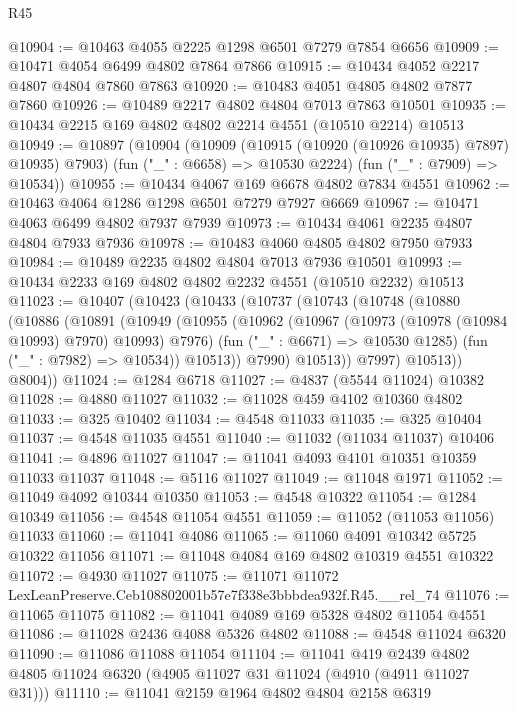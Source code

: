 \begin{lexlean}{R45}
\begin{coremodule}
@10904 := @10463 @4055 @2225 @1298 @6501 @7279 @7854 @6656
@10909 := @10471 @4054 @6499 @4802 @7864 @7866
@10915 := @10434 @4052 @2217 @4807 @4804 @7860 @7863
@10920 := @10483 @4051 @4805 @4802 @7877 @7860
@10926 := @10489 @2217 @4802 @4804 @7013 @7863 @10501
@10935 := @10434 @2215 @169 @4802 @4802 @2214 @4551 (@10510 @2214) @10513
@10949 := @10897
    (@10904
      (@10909 (@10915 (@10920 (@10926 @10935) @7897) @10935) @7903)
      (fun ("_" : @6658) => @10530 @2224)
      (fun ("_" : @7909) => @10534))
@10955 := @10434 @4067 @169 @6678 @4802 @7834 @4551
@10962 := @10463 @4064 @1286 @1298 @6501 @7279 @7927 @6669
@10967 := @10471 @4063 @6499 @4802 @7937 @7939
@10973 := @10434 @4061 @2235 @4807 @4804 @7933 @7936
@10978 := @10483 @4060 @4805 @4802 @7950 @7933
@10984 := @10489 @2235 @4802 @4804 @7013 @7936 @10501
@10993 := @10434 @2233 @169 @4802 @4802 @2232 @4551 (@10510 @2232) @10513
@11023 := @10407
    (@10423
      (@10433
        (@10737
          (@10743
            (@10748
              (@10880
                (@10886
                  (@10891
                    (@10949
                      (@10955
                        (@10962
                          (@10967 (@10973 (@10978 (@10984 @10993) @7970) @10993) @7976)
                          (fun ("_" : @6671) => @10530 @1285)
                          (fun ("_" : @7982) => @10534))
                        @10513))
                    @7990)
                  @10513))
              @7997)
            @10513))
        @8004))
@11024 := @1284 @6718
@11027 := @4837 (@5544 @11024) @10382
@11028 := @4880 @11027
@11032 := @11028 @459 @4102 @10360 @4802
@11033 := @325 @10402
@11034 := @4548 @11033
@11035 := @325 @10404
@11037 := @4548 @11035 @4551
@11040 := @11032 (@11034 @11037) @10406
@11041 := @4896 @11027
@11047 := @11041 @4093 @4101 @10351 @10359 @11033 @11037
@11048 := @5116 @11027
@11049 := @11048 @1971
@11052 := @11049 @4092 @10344 @10350
@11053 := @4548 @10322
@11054 := @1284 @10349
@11056 := @4548 @11054 @4551
@11059 := @11052 (@11053 @11056) @11033
@11060 := @11041 @4086
@11065 := @11060 @4091 @10342 @5725 @10322 @11056
@11071 := @11048 @4084 @169 @4802 @10319 @4551 @10322
@11072 := @4930 @11027
@11075 := @11071 @11072 LexLeanPreserve.Ceb108802001b57e7f338e3bbbdea932f.R45.__rel_74
@11076 := @11065 @11075
@11082 := @11041 @4089 @169 @5328 @4802 @11054 @4551
@11086 := @11028 @2436 @4088 @5326 @4802
@11088 := @4548 @11024 @6320
@11090 := @11086 @11088 @11054
@11104 := @11041
    @419
    @2439
    @4802
    @4805
    @11024
    @6320
    (@4905 @11027 @31 @11024 (@4910 (@4911 @11027 @31)))
@11110 := @11041 @2159 @1964 @4802 @4804 @2158 @6319

\end{coremodule}
\end{lexlean}
